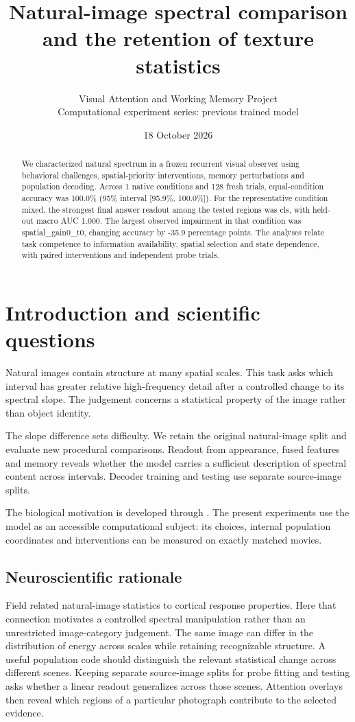 \documentclass[11pt]{article}
\begin{document}
\title{\color{ink}Natural-image spectral comparison and the retention of texture statistics}
\author{Visual Attention and Working Memory Project\\Computational experiment series: previous trained model}\date{18 October 2026}\maketitle
\begin{abstract}
We characterized natural spectrum in a frozen recurrent visual observer using behavioral challenges, spatial-priority interventions, memory perturbations and population decoding. Across 1 native conditions and 128 fresh trials, equal-condition accuracy was 100.0\% (95\% interval [95.9\%, 100.0\%]). For the representative condition mixed, the strongest final answer readout among the tested regions was cls, with held-out macro AUC 1.000. The largest observed impairment in that condition was spatial\_\allowbreak{}gain0\_\allowbreak{}t0, changing accuracy by -35.9 percentage points. The analyses relate task competence to information availability, spatial selection and state dependence, with paired interventions and independent probe trials.
\end{abstract}
\section{Introduction and scientific questions}
Natural images contain structure at many spatial scales. This task asks which interval has greater relative high-frequency detail after a controlled change to its spectral slope. The judgement concerns a statistical property of the image rather than object identity.

The slope difference sets difficulty. We retain the original natural-image split and evaluate new procedural comparisons. Readout from appearance, fused features and memory reveals whether the model carries a sufficient description of spectral content across intervals. Decoder training and testing use separate source-image splits.

The biological motivation is developed through \cite{spectrum}. The present experiments use the model as an accessible computational subject: its choices, internal population coordinates and interventions can be measured on exactly matched movies.

\subsection{Neuroscientific rationale}
Field related natural-image statistics to cortical response properties. Here that connection motivates a controlled spectral manipulation rather than an unrestricted image-category judgement. The same image can differ in the distribution of energy across scales while retaining recognizable structure. A useful population code should distinguish the relevant statistical change across different scenes. Keeping separate source-image splits for probe fitting and testing asks whether a linear readout generalizes across those scenes. Attention overlays then reveal which regions of a particular photograph contribute to the selected evidence.
\end{document}

